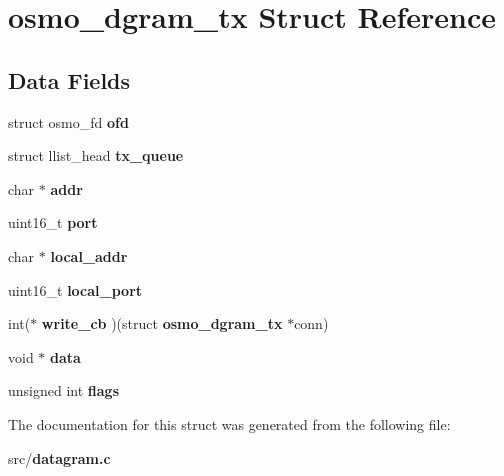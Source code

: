 \section{osmo\+\_\+dgram\+\_\+tx Struct Reference}
\label{structosmo__dgram__tx}
\subsection*{Data Fields}
\begin{DoxyCompactItemize}
\item 
struct osmo\+\_\+fd {\bfseries ofd}\label{structosmo__dgram__tx_a207be20fb8b46dea43f0d00bb3a11d62}

\item 
struct llist\+\_\+head {\bfseries tx\+\_\+queue}\label{structosmo__dgram__tx_a2ac4a03c71e730709d44f6d78fb2854f}

\item 
char $\ast$ {\bfseries addr}\label{structosmo__dgram__tx_adbcdc50c4e16ad9e4209761765363f64}

\item 
uint16\+\_\+t {\bfseries port}\label{structosmo__dgram__tx_a14bd39a91c3f3f59429b1975e2c8ba83}

\item 
char $\ast$ {\bfseries local\+\_\+addr}\label{structosmo__dgram__tx_a47a7a07deb207a6f6803f89dd88a16a4}

\item 
uint16\+\_\+t {\bfseries local\+\_\+port}\label{structosmo__dgram__tx_a80d3e5427bf2b7a557b15918e68bae91}

\item 
int($\ast$ {\bfseries write\+\_\+cb} )(struct {\bf osmo\+\_\+dgram\+\_\+tx} $\ast$conn)\label{structosmo__dgram__tx_a35c03a112f6a745f079e58be365c2df0}

\item 
void $\ast$ {\bfseries data}\label{structosmo__dgram__tx_a7b337ca1e6e50f9dc1a4f6bf4c8270ef}

\item 
unsigned int {\bfseries flags}\label{structosmo__dgram__tx_acebe704c80145f6549e8f2e3720378ff}

\end{DoxyCompactItemize}


The documentation for this struct was generated from the following file\+:\begin{DoxyCompactItemize}
\item 
src/{\bf datagram.\+c}\end{DoxyCompactItemize}
